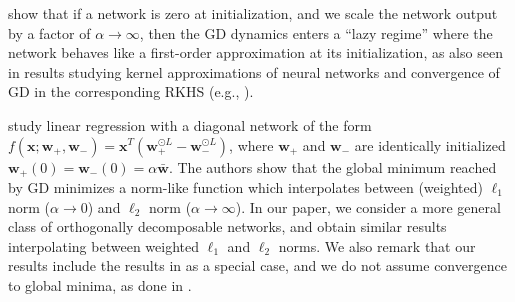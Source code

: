 \documentclass{article} %
\def\vw{{\bm{w}}}
\def\vx{{\bm{x}}}
\newcommand{\bTheta}{\bm{\Theta}}
\begin{document}
\citet{chizat2019lazy} show that if a network is zero at initialization, and we scale the network output by a factor of $\alpha \to \infty$, then the GD dynamics enters a ``lazy regime'' where the network behaves like a first-order approximation at its initialization, as also seen in results studying kernel approximations of neural networks and convergence of GD in the corresponding RKHS (e.g., \citet{jacot2018neural}). 

\citet{woodworth2020kernel} study linear regression with a diagonal network of the form $f(\vx;\vw_+,\vw_-) = \vx^T(\vw_+^{\odot L}-\vw_-^{\odot L})$, where $\vw_+$ and $\vw_-$ are identically initialized $\vw_+(0) = \vw_-(0) = \alpha \bar \vw$. The authors show that the global minimum reached by GD minimizes a norm-like function which interpolates between (weighted) $\ell_1$ norm ($\alpha \to 0$) and $\ell_2$ norm ($\alpha \to \infty$).
In our paper, we consider a more general class of orthogonally decomposable networks, and obtain similar results interpolating between weighted $\ell_1$ and $\ell_2$ norms. We also remark that our results include the results in \citet{arora2019implicit} as a special case, and we do not assume convergence to global minima, as done in \citet{gunasekar2017implicit,arora2019implicit,woodworth2020kernel}.




\end{document}
